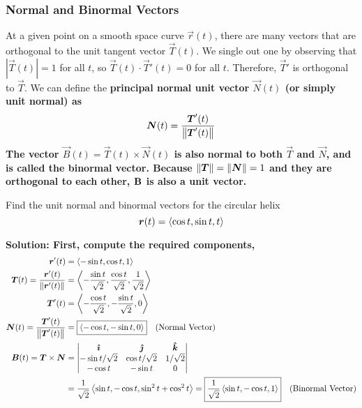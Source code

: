 \subsubsection{Normal and Binormal Vectors}
At a given point on a smooth space curve \(\vec r(t)\), there are many vectors that are orthogonal to the unit tangent vector \(\vec T(t)\). We single out one by observing that \(|\vec T(t)|=1\) for all \(t\), so \(\vec T(t)\cdot \vec T'(t)=0\) for all \(t\). Therefore, \(\vec T'\) is orthogonal to \(\vec T\). We can define the \bf{principal normal unit vector} \(\vec N(t)\) (or simply unit normal) as 
\[ \vec N(t) = \frac{\vec T'(t)}{\norm{\vec T'(t)}}\]
The vector \(\vec B(t) = \vec T(t) \times \vec N(t)\) is also normal to both \(\vec T\) and \(\vec N\), and is called the \bf{binormal vector}. Because \(\norm{\vec T} = \norm{\vec N} = 1\) and they are orthogonal to each other, \(\bf{B}\) is also a unit vector.
\begin{example}
    Find the unit normal and binormal vectors for the circular helix \[ \vec r(t) = \< \cos t, \sin t, t\> \]\par\bf{Solution: }First, compute the required components,
    \begin{align*}
        \vec r'(t) &= \< -\sin t, \cos t, 1 \> \\
        \vec T(t) = \frac{\vec r'(t)}{\norm{\vec r'(t)}} &= \< -\frac{\sin t}{\sqrt 2}, \frac{\cos t}{\sqrt 2}, \frac{1}{\sqrt 2} \> \\
        \vec T'(t) &= \< -\frac{\cos t}{\sqrt 2}, -\frac{\sin t}{\sqrt 2}, 0\> \\
        \vec N(t) = \frac{\vec T'(t)}{\norm{\vec T'(t)}} &= \boxed{\<-\cos t, -\sin t, 0\>}\quad\text{(Normal Vector)} \\
        \vec B(t) = \vec T \times \vec N &= \begin{vmatrix}
            \ihat & \jhat & \khat \\
            -\sin t/\sqrt 2 & \cos t/\sqrt 2 & 1/\sqrt 2 \\
            -\cos t & -\sin t & 0 \\
        \end{vmatrix}  \\
        &= \frac{1}{\sqrt 2}\< \sin t, -\cos t, \sin^2t + \cos^2t\> = \boxed{\frac{1}{\sqrt 2}\<\sin t, -\cos t, 1\>}\quad\text{(Binormal Vector)}
    \end{align*}
\end{example}
